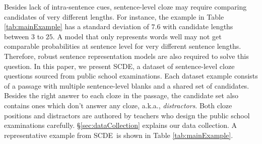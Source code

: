 \documentclass[11pt,a4paper]{article}
\newcommand{\dsname}{\textsc{SCDE}}
\begin{document}
Besides lack of intra-sentence cues, sentence-level cloze may require comparing candidates of very different lengths. For instance, the example in Table \ref{tab:mainExample} has a standard deviation of $7.6$ with candidate lengths between $3$ to $25$. A model that only represents words well may not get comparable probabilities at sentence level for very different sentence lengths. Therefore, robust sentence representation models are also required to solve this question. 
In this paper, we present \dsname, a dataset of sentence-level cloze questions sourced from public school examinations. Each dataset example consists of a passage with multiple sentence-level blanks and a shared set of candidates. Besides the right answer to each cloze in the passage, the candidate set also contains ones which don't answer any cloze, a.k.a., \emph{distractors}. Both cloze positions and distractors are authored by teachers who design the public school examinations carefully. \S \ref{sec:dataCollection} explains our data collection. A representative example from \dsname~is shown in Table \ref{tab:mainExample}. 
\end{document}
